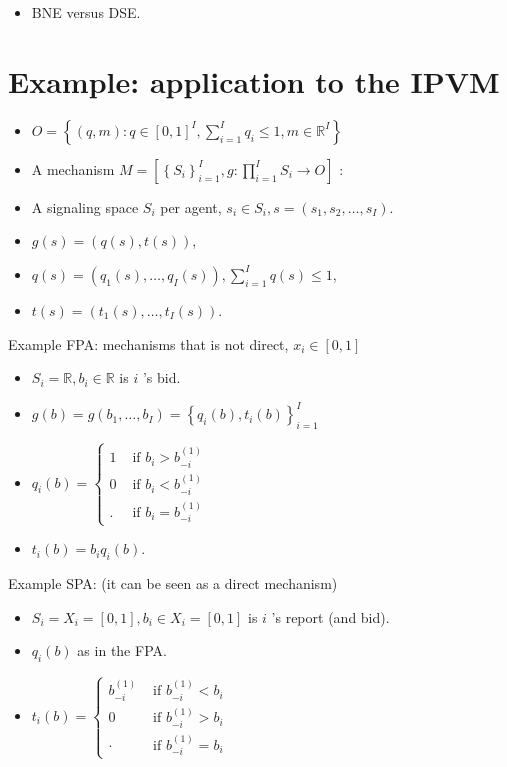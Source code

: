 \documentclass[10pt]{article}
\begin{document}
\begin{itemize}
  \item BNE versus DSE.
\end{itemize}

\section*{Example: application to the IPVM}
\begin{itemize}
  \item $O=\left\{(q, m): q \in[0,1]^{I}, \sum_{i=1}^{I} q_{i} \leq 1, m \in \mathbb{R}^{I}\right\}$
  \item A mechanism $M=\left[\left\{S_{i}\right\}_{i=1}^{I}, g: \prod_{i=1}^{I} S_{i} \rightarrow O\right]$ :
  \item A signaling space $S_{i}$ per agent, $s_{i} \in S_{i}, s=\left(s_{1}, s_{2}, \ldots, s_{I}\right)$.
  \item $g(s)=(q(s), t(s))$,
  \item $q(s)=\left(q_{1}(s), \ldots, q_{I}(s)\right), \sum_{i=1}^{I} q(s) \leq 1$,
  \item $t(s)=\left(t_{1}(s), \ldots, t_{I}(s)\right)$.
\end{itemize}

Example FPA: mechanisms that is not direct, $x_{i} \in[0,1]$

\begin{itemize}
  \item $S_{i}=\mathbb{R}, b_{i} \in \mathbb{R}$ is $i$ 's bid.
  \item $g(b)=g\left(b_{1}, \ldots, b_{I}\right)=\left\{q_{i}(b), t_{i}(b)\right\}_{i=1}^{I}$
  \item $q_{i}(b)= \begin{cases}1 & \text { if } b_{i}>b_{-i}^{(1)} \\ 0 & \text { if } b_{i}<b_{-i}^{(1)} \\ . & \text { if } b_{i}=b_{-i}^{(1)}\end{cases}$
  \item $t_{i}(b)=b_{i} q_{i}(b)$.
\end{itemize}

Example SPA: (it can be seen as a direct mechanism)

\begin{itemize}
  \item $S_{i}=X_{i}=[0,1], b_{i} \in X_{i}=[0,1]$ is $i$ 's report (and bid).
  \item $q_{i}(b)$ as in the FPA.
  \item $t_{i}(b)= \begin{cases}b_{-i}^{(1)} & \text { if } b_{-i}^{(1)}<b_{i} \\ 0 & \text { if } b_{-i}^{(1)}>b_{i} \\ \cdot & \text { if } b_{-i}^{(1)}=b_{i}\end{cases}$
\end{itemize}
\end{document}
